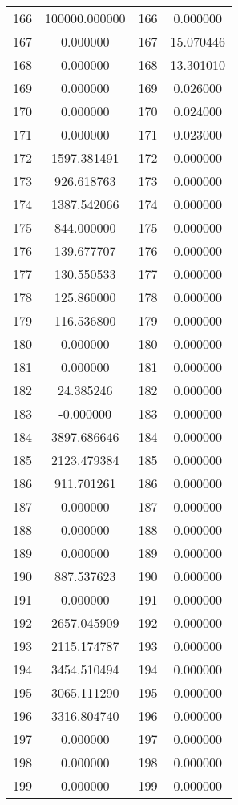 \documentclass[12pt]{article}
\begin{document}
\begin{longtable}{@{}cccc@{}}
166 & 100000.000000 & 166 & 0.000000 \\
167 & 0.000000 & 167 & 15.070446 \\
168 & 0.000000 & 168 & 13.301010 \\
169 & 0.000000 & 169 & 0.026000 \\
170 & 0.000000 & 170 & 0.024000 \\
171 & 0.000000 & 171 & 0.023000 \\
172 & 1597.381491 & 172 & 0.000000 \\
173 & 926.618763 & 173 & 0.000000 \\
174 & 1387.542066 & 174 & 0.000000 \\
175 & 844.000000 & 175 & 0.000000 \\
176 & 139.677707 & 176 & 0.000000 \\
177 & 130.550533 & 177 & 0.000000 \\
178 & 125.860000 & 178 & 0.000000 \\
179 & 116.536800 & 179 & 0.000000 \\
180 & 0.000000 & 180 & 0.000000 \\
181 & 0.000000 & 181 & 0.000000 \\
182 & 24.385246 & 182 & 0.000000 \\
183 & -0.000000 & 183 & 0.000000 \\
184 & 3897.686646 & 184 & 0.000000 \\
185 & 2123.479384 & 185 & 0.000000 \\
186 & 911.701261 & 186 & 0.000000 \\
187 & 0.000000 & 187 & 0.000000 \\
188 & 0.000000 & 188 & 0.000000 \\
189 & 0.000000 & 189 & 0.000000 \\
190 & 887.537623 & 190 & 0.000000 \\
191 & 0.000000 & 191 & 0.000000 \\
192 & 2657.045909 & 192 & 0.000000 \\
193 & 2115.174787 & 193 & 0.000000 \\
194 & 3454.510494 & 194 & 0.000000 \\
195 & 3065.111290 & 195 & 0.000000 \\
196 & 3316.804740 & 196 & 0.000000 \\
197 & 0.000000 & 197 & 0.000000 \\
198 & 0.000000 & 198 & 0.000000 \\
199 & 0.000000 & 199 & 0.000000 \\

\end{longtable}
\end{document}
